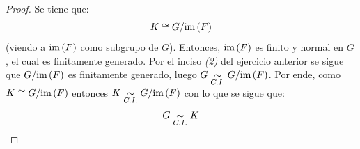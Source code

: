 \documentclass[12pt]{report}
\newcounter{it}
\theoremstyle{largebreak}
\begin{document}
    \begin{proof}
        Se tiene que:
        \begin{equation*}
            K\cong G/\textup{im}\left(F\right)
        \end{equation*}
        (viendo a $\textup{im}\left(F\right)$ como subgrupo de $G$). Entonces, $\textup{im}\left(F\right)$ es finito y normal en $G$, el cual es finitamente generado. Por el inciso \textit{(2)} del ejercicio anterior se sigue que $G/\textup{im}\left(F\right)$ es finitamente generado, luego $G\underset{C.I.}{\sim} G/\textup{im}\left(F\right)$. Por ende, como $K\cong G/\textup{im}\left(F\right)$ entonces $K\underset{C.I.}{\sim} G/\textup{im}\left(F\right)$ con lo que se sigue que:
        \begin{equation*}
            G\underset{C.I.}{\sim} K
        \end{equation*} 
    \end{proof}
\end{document}
